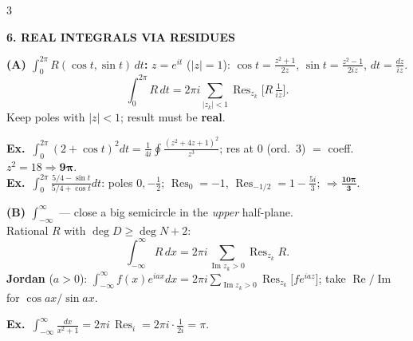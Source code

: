 \documentclass[a4paper,8pt]{extarticle}
\newcommand{\topic}[2]{%
  \vspace{4.5pt}%
  {\colorbox{#1}{\parbox{\dimexpr\columnwidth-2\fboxsep}{\color{white}\bfseries\footnotesize #2}}}\par\vspace{2.5pt}}
\newcommand{\exo}{\textbf{\textcolor{cA}{Ex.}}\ }
\newcommand{\Res}{\operatorname{Res}}
\renewcommand{\Re}{\operatorname{Re}}
\renewcommand{\Im}{\operatorname{Im}}
\newcommand{\half}{\tfrac12}
\newcommand{\ds}{\displaystyle}
\begin{document}
\begin{multicols}{3}
\topic{cA}{6. REAL INTEGRALS VIA RESIDUES}
\textbf{(A) $\int_0^{2\pi}R(\cos t,\sin t)\,dt$:} $z{=}e^{it}$ ($|z|{=}1$): $\cos t{=}\frac{z^2+1}{2z}$, $\sin t{=}\frac{z^2-1}{2iz}$, $dt{=}\frac{dz}{iz}$.
\[ \int_0^{2\pi}\!\!R\,dt=2\pi i\!\!\sum_{|z_k|<1}\!\!\Res_{z_k}\!\big[R\,\tfrac1{iz}\big].\]
Keep poles with $|z|{<}1$; result must be \textbf{real}.
\begin{ex}
\exo $\int_0^{2\pi}(2{+}\cos t)^2dt=\frac1{4i}\oint\frac{(z^2+4z+1)^2}{z^3}$; res at $0$ (ord.\ 3) $=$ coeff.\ $z^2={18}\Rightarrow\mathbf{9\pi}$.\\
\exo $\int_0^{2\pi}\frac{5/4-\sin t}{5/4+\cos t}dt$: poles $0,{-}\half$; $\Res_0{=}{-}1$, $\Res_{-1/2}{=}1{-}\frac{5i}3$; $\Rightarrow\mathbf{\frac{10\pi}3}$.
\end{ex}
\textbf{(B) $\int_{-\infty}^{\infty}$} — close a big semicircle in the \emph{upper} half-plane.\\
Rational $R$ with $\deg D\ge\deg N{+}2$:
\[ \int_{-\infty}^{\infty}\!R\,dx=2\pi i\!\!\sum_{\Im z_k>0}\!\!\Res_{z_k}R.\]
\textbf{Jordan} ($a{>}0$): $\ds\int_{-\infty}^{\infty}\!f(x)e^{iax}dx=2\pi i\!\!\sum_{\Im z_k>0}\!\!\Res_{z_k}\!\big[f e^{iaz}\big]$; take $\Re/\Im$ for $\cos ax/\sin ax$.
\begin{ex}\exo $\int_{-\infty}^{\infty}\frac{dx}{x^2+1}=2\pi i\,\Res_{i}=2\pi i\cdot\frac1{2i}=\pi$.\end{ex}


\end{multicols}
\end{document}
